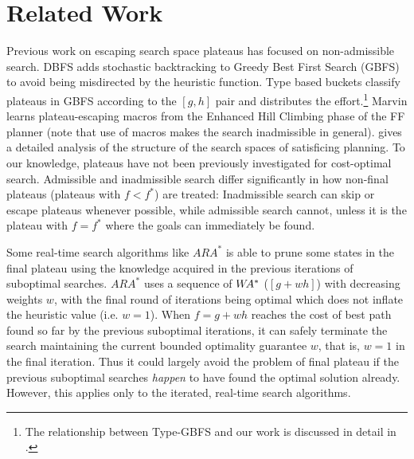 
\section{Related Work}

Previous work on escaping search space plateaus has focused on
non-admissible search.  DBFS \cite{imai2011novel} %
adds stochastic backtracking to Greedy Best First Search (GBFS) to avoid
being misdirected by the heuristic function. Type based buckets
\cite{xie14type} classify plateaus in GBFS according to the
$[g,h]$ pair and distributes the effort.\footnote{The relationship between Type-GBFS and our work is discussed in detail in .}  Marvin \cite{Coles07} learns plateau-escaping macros
from the Enhanced Hill Climbing phase of the FF planner
\cite{Hoffmann01} (note that use of macros makes the search inadmissible in general).
\citeauthor{Hoffmann05} \citeyear{Hoffmann05,Hoffmann11} gives a detailed analysis of the
structure of the search spaces of satisficing planning.
% 
To our knowledge, plateaus have not been previously investigated for cost-optimal search.
Admissible and inadmissible search differ significantly in how non-final plateaus (plateaus with $f < f^*$) are treated:
Inadmissible search can skip or escape plateaus whenever possible, while
admissible search cannot, unless it is the plateau with $f=f^*$ where the goals can immediately be found.

Some real-time search algorithms like $ARA^*$ \cite{likhachev2008anytime} is able to prune some states in the final plateau using the knowledge acquired in the previous iterations of suboptimal searches. $ARA^*$ uses a sequence of $W\hspace{-0.2em}A^*$ ($[g+wh]$) with decreasing weights $w$, with the final round of iterations being optimal \astar which does not inflate the heuristic value (i.e. $w=1$). When $f=g+wh$ reaches the cost of best path found so far by the previous suboptimal iterations, it can safely terminate the search maintaining the current bounded optimality guarantee $w$, that is, $w=1$ in the final iteration. Thus it could largely avoid the problem of final plateau if the previous suboptimal searches \emph{happen} to have found the optimal solution already. However, this applies only to the iterated, real-time search algorithms.

